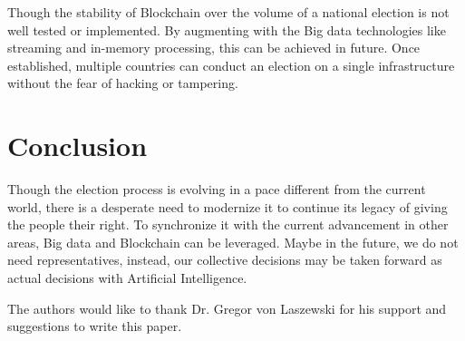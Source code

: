 \documentclass[sigconf]{acmart}
\begin{document}
Though the stability of Blockchain over the volume of a national election is not well tested or implemented. By augmenting with the Big data technologies like streaming and in-memory processing, this can be achieved in future. Once established, multiple countries can conduct an election on a single infrastructure without the fear of hacking or tampering.

\section{Conclusion}
Though the election process is evolving in a pace different from the current world, there is a desperate need to modernize it to continue its legacy of giving the people their right. To synchronize it with the current advancement in other areas, Big data and Blockchain can be leveraged.
Maybe in the future, we do not need representatives, instead, our collective decisions may be taken forward as actual decisions with Artificial Intelligence.

\begin{acks}

  The authors would like to thank Dr. Gregor von Laszewski for his
  support and suggestions to write this paper.
\end{acks}


 


\end{document}
